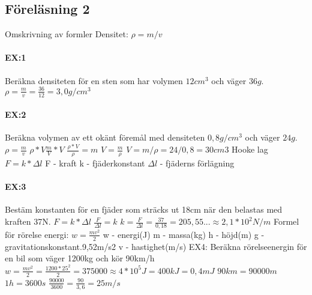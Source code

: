 \documentclass[a4paper,11pt]{article}
\begin{document}
\begin{flushleft}
\section{Föreläsning 2}
Omskrivning av formler\newline
Densitet: $ \rho = m/v $\newline
\paragraph{EX:1}
Beräkna densiteten för en sten som har volymen $ 12cm^3 $ och väger $ 36 g $.\newline
$ \rho = \frac{m}{v} = \frac{36}{12} = 3,0g/cm^3 $\newline \newline
\paragraph{EX:2}
Beräkna volymen av ett okänt föremål med densiteten $ 0,8g/cm^3 $ och väger $ 24g $.\newline
$ \rho = \frac{m}{v} $\newline
$ \rho * V \frac{m}{V} * V $\newline
$ \frac{\rho * V}{\rho} = m $\newline
$ V = \frac{m}{\rho} $\newline
$ V=m/\rho = 24/0,8 = 30cm3 $ \newline
Hooke lag\newline
$ F=k*\Delta l $\newline
F - kraft\newline
k - fjäderkonstant\newline
$ \Delta l $ - fjäderns förlägning\newline
\paragraph{EX:3}
Bestäm konstanten för en fjäder  som sträcks ut 18cm när den belastas med kraften 37N.\newline
$ F=k*\Delta l $\newline
$ \frac{F}{\Delta l} = k $\newline
$ k = \frac{F}{\Delta l} = \frac{37}{0,18} = 205,55... \approx 2,1*10^2 N/m $\newline
Formel för rörelse energi: $ w = \frac{mv^2}{2} $\newline
w - energi(J)\newline
m - massa(kg)\newline
h - höjd(m)\newline
g - gravitationskonstant.9,52m/s2\newline
v - hastighet(m/s)\newline
EX4:\newline
Beräkna rörelseenergin för en bil som väger 1200kg och kör 90km/h\newline
$ w = \frac{mv^2}{2} = \frac{1200*25^2}{2} = 375000 \approx 4*10^5 J = 400 kJ = 0,4 mJ $\newline
$ 90km = 90000m $\newline
$ 1h = 3600s $\newline
$ \frac{90000}{3600} = \frac{90}{3,6} = 25m/s $\newline
\newpage

\end{flushleft}
\end{document}
